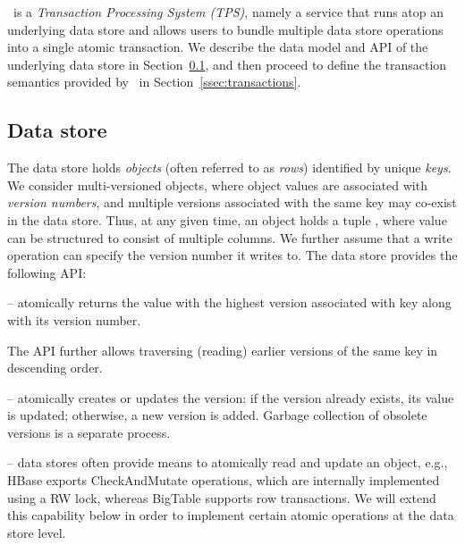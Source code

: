 

\sys\ is a \emph{Transaction Processing System (TPS)}, namely a service that runs atop an underlying data store and 
allows users to bundle multiple data store operations into a single atomic transaction. 
We describe the data model and API of the underlying data store in Section~\ref{ssec:data-model}, and 
then proceed to define  the transaction semantics provided by \sys\ in Section~\ref{ssec:transactions}. 

\subsection{Data store}
\label{ssec:data-model}

The  data store holds  \emph{objects} (often referred to as \emph{rows}) identified by unique \emph{keys}.
We consider multi-versioned objects, where object values are associated with \emph{version numbers}, and
multiple versions associated with the same key may co-exist in the data store.
Thus, at any given time, an object holds a tuple , where value
can be structured to consist of multiple columns.
We further assume that a write operation can specify the version number it writes to.
The  data store provides the following API:
\begin{description}
\item [] -- atomically returns the value with
the highest version associated with key along with its version number.
\item The API further allows traversing (reading) earlier versions of the same
key in descending order.
\item [\code{write(key,value,version)}] -- atomically creates or updates the version:
if the version already exists, its value is updated;
otherwise, a new version is added. Garbage collection of obsolete versions is a separate
process.
\item [checkAndMutate] --  data stores often provide means to atomically read and
update an object, e.g., HBase exports CheckAndMutate operations, which are 
internally implemented using a RW lock, whereas BigTable supports row transactions. 
We will extend this capability below in order to implement certain atomic
operations at the data store level.
\end{description}

